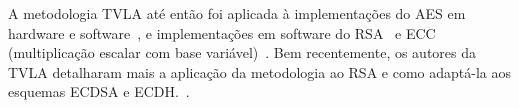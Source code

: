 A metodologia TVLA até então foi aplicada à implementações do AES em hardware e software~\cite{Goodwill2011,Cooper2013,MatherOswaldBandenburg2013}, e implementações em software do RSA~\cite{Witteman2011} e ECC (multiplicação escalar com base variável)~\cite{Nascimento2015_Space}. Bem recentemente, os autores da TVLA detalharam mais a aplicação da metodologia ao RSA e como adaptá-la aos esquemas ECDSA e ECDH.~\cite{TunstallGoodwill2016}.

